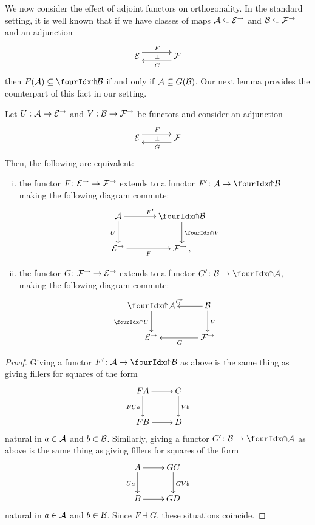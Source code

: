 \documentclass[reqno,10pt,a4paper,oneside]{amsart}
\begin{document}
\medskip

We now consider the effect of adjoint functors on orthogonality. In the standard setting, it is well known that if 
we have classes of maps $\cal{A} \subseteq \cal{E}^\to$ and $\cal{B} \subseteq \cal{F}^\to$ and an adjunction
\[
\xymatrix@C+1em{
  \cal{E}
  \ar@<5pt>[r]^{F}
  \ar@{}[r]|{\bot}
&
  \cal{F}
  \ar@<5pt>[l]^{G}
}
\]
then $F(\cal{A}) \subseteq \liftl{\cal{B}}$ if and only if $\cal{A} \subseteq G(\cal{B})$. Our next lemma provides the counterpart of this fact in our setting.




\begin{proposition} \label{lift-of-adjunction} 
Let $U : \cal{A} \to \cal{E}^{\to}$ and $V : \cal{B} \to \cal{F}^{\to}$ be functors and consider an adjunction
\[
\xymatrix@C+1em{
  \cal{E}
  \ar@<5pt>[r]^{F}
  \ar@{}[r]|{\bot}
&
  \cal{F}
  \ar@<5pt>[l]^{G}
}
\]
Then, the following are equivalent:
\begin{enumerate}[(i)] 
\item the  functor $F \co \cal{E}^\to \to \cal{F}^\to$ extends to a functor $F' \co \cal{A} \to \liftl{\cal{B}}$ making the following diagram commute:
\[
\xymatrix@C=1.2cm{
  \cal{A}
  \ar[r]^{F'}
  \ar[d]_{U}
&
  \liftl{\cal{B}}
  \ar[d]^{\liftl{V}}
\\
  \cal{E}^{\to}
  \ar[r]_-{F}
&
  \cal{F}^{\to}\, ,}
\]
\item the functor $G \co \cal{F}^\to \to \cal{E}^\to$ extends to a functor $G' \co \cal{B} \to \liftr{\cal{A}}$, making the following diagram commute:
\[
\xymatrix{
  \liftr{\cal{A}}
  \ar[d]_{\liftr{U}}
&
  \cal{B}
  \ar[l]_{G'} 
  \ar[d]^{V}
\\
  \cal{E}^{\to}
&
  \cal{F}^{\to}
  \ar[l]^{G}
}
\]
\end{enumerate}
\end{proposition}

\begin{proof} Giving a functor $F' \co \cal{A} \to \liftl{\cal{B}}$ as above is the same thing as giving fillers for squares of the form
\[
\xymatrix{
FA \ar[d]_{FUa} \ar[r] & C \ar[d]^{Vb} \\
FB \ar[r] & D }
\]
natural in $a  \in \cal{A}$ and $b \in \cal{B}$. Similarly, giving a functor $G' \co \cal{B} \to \liftl{\cal{A}}$ as above is the same thing as giving fillers for squares 
of the form
\[
\xymatrix{
A \ar[d]_{Ua} \ar[r] & GC \ar[d]^{GVb} \\
B \ar[r] & GD }
\]
 natural in $a \in \cal{A}$ and $b \in \cal{B}$. Since $F \dashv G$, these situations coincide.
\end{proof}
\end{document}
